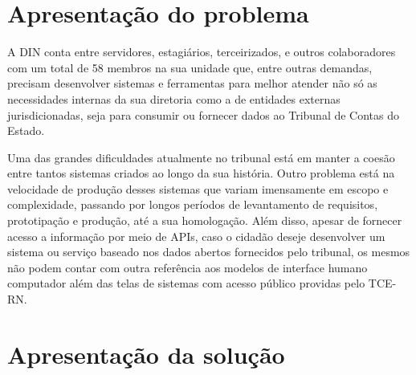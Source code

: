\section{Apresentação do problema }

  A DIN conta entre servidores, estagiários, terceirizados, e outros colaboradores com um total de 58 membros na sua unidade \cite{relatorio_trimestral} que, entre outras demandas, precisam desenvolver sistemas e ferramentas para melhor atender não só as necessidades internas da sua diretoria como a de entidades externas jurisdicionadas, seja para consumir ou fornecer dados ao Tribunal de Contas do Estado.

  Uma das grandes dificuldades atualmente no tribunal está em manter a coesão entre tantos sistemas criados ao longo da sua história. Outro problema está na velocidade de produção desses sistemas que variam imensamente em escopo e complexidade, passando por longos períodos de levantamento de requisitos, prototipação e produção, até a sua homologação. Além disso, apesar de fornecer acesso a informação por meio de APIs, caso o cidadão deseje desenvolver um sistema ou serviço baseado nos dados abertos fornecidos pelo tribunal, os mesmos não podem contar com outra referência aos modelos de interface humano computador além das telas de sistemas com acesso público providas pelo TCE-RN.



\section{Apresentação da solução }

